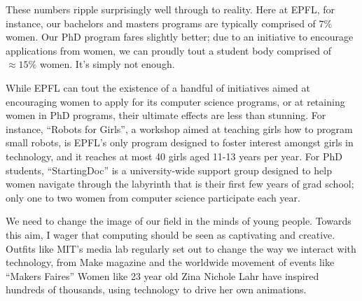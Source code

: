 \documentclass[acmtocl]{acmtrans2m}
\newcommand{\comment}[1]{}
\begin{document}
These numbers ripple surprisingly well through to reality. Here at EPFL, for
instance, our bachelors and masters programs are typically comprised of
\href{http://www.swissict.ch/fileadmin/award/Impressionen/Symposium/WillyZwaenepoel\_ICT-Akademie.pdf}{$7\%$}~\cite{Willy}
women. Our PhD program fares slightly better; due to an initiative to
encourage applications from women, we can proudly tout a student body
comprised of $\approx15\%$ women. It's simply not enough.

While EPFL can tout the existence of a handful of initiatives aimed at
encouraging women to apply for its computer science programs, or at retaining
women in PhD programs, their ultimate effects are less than stunning. For
instance, ``Robots for Girls'', a workshop aimed at teaching girls how to
program small robots, is EPFL's only program designed to foster interest
amongst girls in technology,
and it reaches at most 40 girls aged 11-13 years per year.
For PhD students, ``StartingDoc'' is a university-wide support group designed
to help women navigate through the labyrinth that is their first few years of
grad school; only one to two women from computer science participate each year.


We need to change the image of our field in the minds of young people. Towards
this aim, I wager that computing should be seen as captivating and creative.
Outfits like MIT's media lab regularly set out to change the way we interact
with technology, from Make magazine and the worldwide movement of events like
``Makers Faires'' Women like 23 year old Zina Nichole Lahr have inspired
hundreds of thousands, using technology to drive her own animations.




\end{document}
